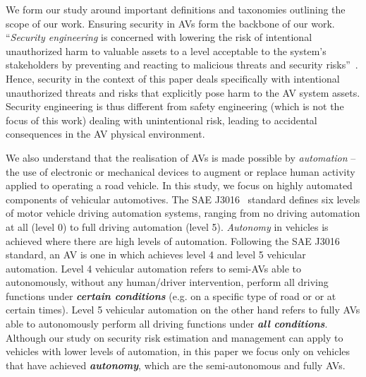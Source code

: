\documentclass[runningheads]{llncs}
\begin{document}
We form our study around important definitions and taxonomies outlining the scope of our work. 
Ensuring security in AVs form the backbone of our work. 
``\textit{Security engineering} is concerned with lowering the risk of intentional unauthorized harm to valuable assets to a level acceptable to the system's stakeholders by preventing and reacting to malicious threats and security risks''~\cite{firesmith2007engineering}. 
Hence, security in the context of this paper deals specifically with intentional unauthorized threats and risks that explicitly pose harm to the AV system assets. Security engineering is thus different from safety engineering (which is not the focus of this work) dealing with unintentional risk, leading to accidental consequences in the AV physical environment.
%

We also understand that the realisation of AVs is made possible by \textit{automation} -- the use of electronic or mechanical devices to augment or replace human activity applied to operating a road vehicle. In this study, we focus on highly automated components of vehicular automotives. The SAE J3016~\cite{vehicle2016j3061} standard defines six levels of motor vehicle driving automation systems, ranging from no driving automation at all (level 0) to full driving automation (level 5). %
%
%
\textit{Autonomy} in vehicles is achieved where there are high levels of automation. Following the SAE J3016~\cite{vehicle2016j3061} standard, an AV is one in which achieves level 4 and level 5 vehicular automation. Level 4 vehicular automation refers to semi-AVs able to autonomously, without any human/driver intervention, perform all driving functions under \textbf{\textit{certain conditions}} (e.g. on a specific type of road or or at certain times). Level 5 vehicular automation on the other hand refers to fully AVs able to autonomously perform all driving functions under \textbf{\textit{all conditions}}.
%
Although our study on security risk estimation and management can apply to vehicles with lower levels of automation, in this paper we focus only on vehicles that have achieved \textbf{\textit{autonomy}}, which are the semi-autonomous and fully AVs.  
\end{document}
